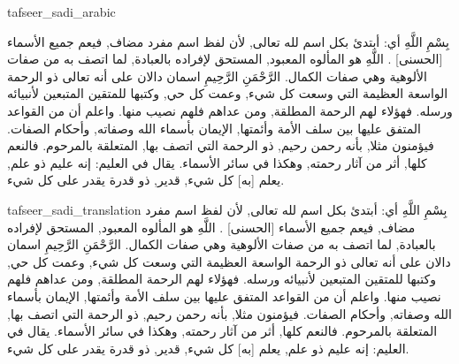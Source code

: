 \begin{taggedblock}{tafseer_sadi_arabic}
\begin{Arabic}
{ بِسْمِ اللَّهِ }
أي: أبتدئ بكل اسم لله تعالى, لأن لفظ
{ اسم }
مفرد مضاف, فيعم جميع الأسماء
[الحسنى]
.
{ اللَّهِ }
هو المألوه المعبود, المستحق لإفراده بالعبادة, لما اتصف به من صفات الألوهية وهي صفات الكمال.
{ الرَّحْمَنِ الرَّحِيمِ }
اسمان دالان على أنه تعالى ذو الرحمة الواسعة العظيمة التي وسعت كل شيء, وعمت كل حي, وكتبها للمتقين المتبعين لأنبيائه ورسله. فهؤلاء لهم الرحمة المطلقة, ومن عداهم فلهم نصيب منها. واعلم أن من القواعد المتفق عليها بين سلف الأمة وأئمتها, الإيمان بأسماء الله وصفاته, وأحكام الصفات. فيؤمنون مثلا, بأنه رحمن رحيم, ذو الرحمة التي اتصف بها, المتعلقة بالمرحوم. فالنعم كلها, أثر من آثار رحمته, وهكذا في سائر الأسماء. يقال في العليم: إنه عليم ذو علم, يعلم
[به]
كل شيء, قدير, ذو قدرة يقدر على كل شيء.
\end{Arabic}
\end{taggedblock}
\begin{taggedblock}{tafseer_sadi_translation}
{ بِسْمِ اللَّهِ }
أي: أبتدئ بكل اسم لله تعالى, لأن لفظ
{ اسم }
مفرد مضاف, فيعم جميع الأسماء
[الحسنى]
.
{ اللَّهِ }
هو المألوه المعبود, المستحق لإفراده بالعبادة, لما اتصف به من صفات الألوهية وهي صفات الكمال.
{ الرَّحْمَنِ الرَّحِيمِ }
اسمان دالان على أنه تعالى ذو الرحمة الواسعة العظيمة التي وسعت كل شيء, وعمت كل حي, وكتبها للمتقين المتبعين لأنبيائه ورسله. فهؤلاء لهم الرحمة المطلقة, ومن عداهم فلهم نصيب منها. واعلم أن من القواعد المتفق عليها بين سلف الأمة وأئمتها, الإيمان بأسماء الله وصفاته, وأحكام الصفات. فيؤمنون مثلا, بأنه رحمن رحيم, ذو الرحمة التي اتصف بها, المتعلقة بالمرحوم. فالنعم كلها, أثر من آثار رحمته, وهكذا في سائر الأسماء. يقال في العليم: إنه عليم ذو علم, يعلم
[به]
كل شيء, قدير, ذو قدرة يقدر على كل شيء.
\end{taggedblock}

\begin{comment}
Please use the following for footnotes:- Sample\footnoteQ{Text of Qur'an footnote goes here.}.
Sample\footnoteT{Text of Tafseer footnote goes here.}.
\end{comment}